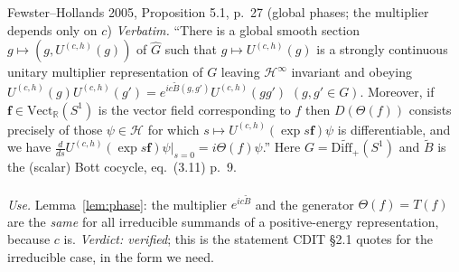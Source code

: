\documentclass[11pt]{article}
\newcommand{\Hil}{\mathcal H}
\newcommand{\Diff}{\mathrm{Diff}_+}
\begin{document}
\begin{citedbox}{Fewster--Hollands 2005, Proposition 5.1, p.~27 (global phases; the multiplier depends only on $c$)}
\emph{Verbatim.}  ``There is a global smooth section $g\mapsto(g,U^{(c,h)}(g))$ of $\widehat G$ such that
$g\mapsto U^{(c,h)}(g)$ is a strongly continuous unitary multiplier representation of $G$ leaving $\Hil^\infty$
invariant and obeying $U^{(c,h)}(g)U^{(c,h)}(g')=e^{ic\widetilde B(g,g')}U^{(c,h)}(gg')$ $(g,g'\in G)$.  Moreover, if
$\mathbf f\in\mathrm{Vect}_{\mathbb R}(S^1)$ is the vector field corresponding to $f$ then $D(\Theta(f))$ consists
precisely of those $\psi\in\Hil$ for which $s\mapsto U^{(c,h)}(\exp s\mathbf f)\psi$ is differentiable, and we have
$\frac{d}{ds}U^{(c,h)}(\exp s\mathbf f)\psi|_{s=0}=i\Theta(f)\psi$.''  Here $G=\widetilde{\Diff}(S^1)$ and
$\widetilde B$ is the (scalar) Bott cocycle, eq.~(3.11) p.~9.\\[2pt]
\\[2pt]
\emph{Use.}  Lemma~\ref{lem:phase}: the multiplier $e^{ic\widetilde B}$ and the generator $\Theta(f)=T(f)$ are the
\emph{same} for all irreducible summands of a positive-energy representation, because $c$ is.
\emph{Verdict: verified}; this is the statement CDIT \S2.1 quotes for the irreducible case, in the form we need.
\end{citedbox}
\end{document}
